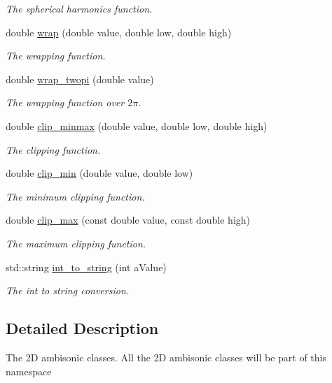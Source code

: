 \begin{DoxyCompactItemize}
\begin{DoxyCompactList}\small\item\em The spherical harmonics function. \end{DoxyCompactList}\item 
double \hyperlink{namespace_hoa2_d_afd27612b742142b67ede5e8832a23b84}{wrap} (double value, double low, double high)
\begin{DoxyCompactList}\small\item\em The wrapping function. \end{DoxyCompactList}\item 
double \hyperlink{namespace_hoa2_d_ae6e7b10b18969cb19586af7e6e63736c}{wrap\-\_\-twopi} (double value)
\begin{DoxyCompactList}\small\item\em The wrapping function over $2\pi$. \end{DoxyCompactList}\item 
double \hyperlink{namespace_hoa2_d_a50f26f1b34047d91125e58bcbabedcdd}{clip\-\_\-minmax} (double value, double low, double high)
\begin{DoxyCompactList}\small\item\em The clipping function. \end{DoxyCompactList}\item 
double \hyperlink{namespace_hoa2_d_aea812f1670707ecf3f186a0b56dce8e4}{clip\-\_\-min} (double value, double low)
\begin{DoxyCompactList}\small\item\em The minimum clipping function. \end{DoxyCompactList}\item 
double \hyperlink{namespace_hoa2_d_af4eef86aafa35ba792d9a64f5b00b762}{clip\-\_\-max} (const double value, const double high)
\begin{DoxyCompactList}\small\item\em The maximum clipping function. \end{DoxyCompactList}\item 
std\-::string \hyperlink{namespace_hoa2_d_a65c2a4f5f1687cc7e961f6b4c67af643}{int\-\_\-to\-\_\-string} (int a\-Value)
\begin{DoxyCompactList}\small\item\em The int to string conversion. \end{DoxyCompactList}\end{DoxyCompactItemize}


\subsection{Detailed Description}
The 2\-D ambisonic classes. All the 2\-D ambisonic classes will be part of this namespace 


